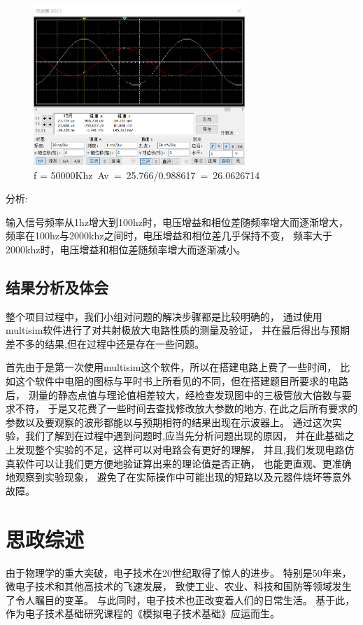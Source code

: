 \documentclass[10pt, conference, compsocconf, a4paper]{IEEEtran}
\begin{document}
\begin{figure}[h]
  \includegraphics[width=8cm]{img/j.png}
  \caption{f = 50000Khz Av = 25.766/0.988617 = 26.0626714}
\end{figure}



分析:\par
输入信号频率从1hz增大到100hz时，电压增益和相位差随频率增大而逐渐增大，
频率在100hz与2000khz之间时，电压增益和相位差几乎保持不变，
频率大于2000khz时，电压增益和相位差随频率增大而逐渐减小。

\subsection{结果分析及体会}
整个项目过程中，我们小组对问题的解决步骤都是比较明确的，
通过使用multisim软件进行了对共射极放大电路性质的测量及验证，
并在最后得出与预期差不多的结果,但在过程中还是存在一些问题。\par
首先由于是第一次使用multisim这个软件，所以在搭建电路上费了一些时间，
比如这个软件中电阻的图标与平时书上所看见的不同，但在搭建题目所要求的电路后，
测量的静态点值与理论值相差较大，经检查发现图中的三极管放大倍数与要求不符，
于是又花费了一些时间去查找修改放大参数的地方,
在此之后所有要求的参数以及要观察的波形都能以与预期相符的结果出现在示波器上。
通过这次实验，我们了解到在过程中遇到问题时,应当先分析问题出现的原因，
并在此基础之上发现整个实验的不足，这样可以对电路会有更好的理解，
并且,我们发现电路仿真软件可以让我们更方便地验证算出来的理论值是否正确，
也能更直观、更准确地观察到实验现象，
避免了在实际操作中可能出现的短路以及元器件烧坏等意外故障。

\section{思政综述}

由于物理学的重大突破，电子技术在20世纪取得了惊人的进步。
特别是50年来，微电子技术和其他高技术的飞速发展，
致使工业、农业、科技和国防等领域发生了令人瞩目的变革。
与此同时，电子技术也正改变着人们的日常生活。
基于此，作为电子技术基础研究课程的《模拟电子技术基础》应运而生。\cite{wang2009}
\par
\end{document}
